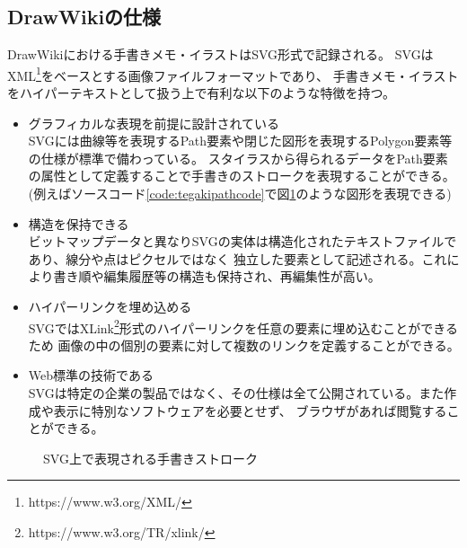 \subsection{DrawWikiの仕様}
DrawWikiにおける手書きメモ・イラストはSVG\cite{aboutsvg}形式で記録される。
SVGはXML\footnote{https://www.w3.org/XML/}をベースとする画像ファイルフォーマットであり、
手書きメモ・イラストをハイパーテキストとして扱う上で有利な以下のような特徴を持つ。
\begin{itemize}
    \item グラフィカルな表現を前提に設計されている\\
    SVGには曲線等を表現するPath要素や閉じた図形を表現するPolygon要素等の仕様が標準で備わっている。
    スタイラスから得られるデータをPath要素の属性として定義することで手書きのストロークを表現することができる。
    (例えばソースコード\ref{code:tegakipathcode}で図\ref{fig:tegakipath}のような図形を表現できる)
    \item 構造を保持できる\\
    ビットマップデータと異なりSVGの実体は構造化されたテキストファイルであり、線分や点はピクセルではなく
    独立した要素として記述される。これにより書き順や編集履歴等の構造も保持され、再編集性が高い。
    \item ハイパーリンクを埋め込める\\
    SVGではXLink\footnote{https://www.w3.org/TR/xlink/}形式のハイパーリンクを任意の要素に埋め込むことができるため
    画像の中の個別の要素に対して複数のリンクを定義することができる。
    \item Web標準の技術である\\
    SVGは特定の企業の製品ではなく、その仕様は全て公開されている。また作成や表示に特別なソフトウェアを必要とせず、
    ブラウザがあれば閲覧することができる。
\end{itemize}

\begin{figure}[htbp]
    \begin{center}
         \end{center}
    \caption{SVG上で表現される手書きストローク} \label{fig:tegakipath}
\end{figure}

